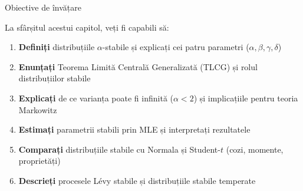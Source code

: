 \documentclass[9pt, aspectratio=169, t]{beamer}
\theoremstyle{definition}
\begin{document}
\begin{frame}{Obiective de învățare}
    \begin{block}{La sfârșitul acestui capitol, veți fi capabili să:}
    \begin{enumerate}
        \item[\textcolor{MainBlue}{\textbf{1.}}] \textbf{Definiți} distribuțiile $\alpha$-stabile și explicați cei patru parametri ($\alpha, \beta, \gamma, \delta$)
        \item[\textcolor{MainBlue}{\textbf{2.}}] \textbf{Enunțați} Teorema Limită Centrală Generalizată (TLCG) și rolul distribuțiilor stabile
        \item[\textcolor{MainBlue}{\textbf{3.}}] \textbf{Explicați} de ce varianța poate fi infinită ($\alpha < 2$) și implicațiile pentru teoria Markowitz
        \item[\textcolor{MainBlue}{\textbf{4.}}] \textbf{Estimați} parametrii stabili prin MLE și interpretați rezultatele
        \item[\textcolor{MainBlue}{\textbf{5.}}] \textbf{Comparați} distribuțiile stabile cu Normala și Student-$t$ (cozi, momente, proprietăți)
        \item[\textcolor{MainBlue}{\textbf{6.}}] \textbf{Descrieți} procesele L\'{e}vy stabile și distribuțiile stabile temperate
    \end{enumerate}
    \end{block}
\end{frame}
\end{document}
